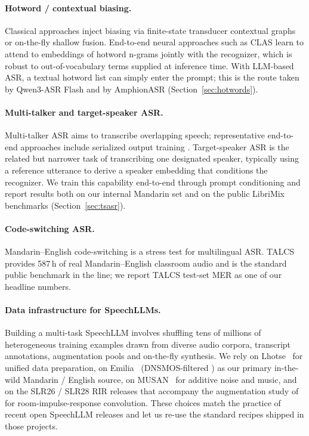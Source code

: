 \paragraph{Hotword / contextual biasing.}
Classical approaches inject biasing via finite-state transducer
contextual graphs or on-the-fly shallow fusion. End-to-end neural
approaches such as CLAS \cite{pundak2018deep} learn to attend to
embeddings of hotword n-grams jointly with the recognizer, which is
robust to out-of-vocabulary terms supplied at inference time. With
LLM-based ASR, a textual hotword list can simply enter the prompt; this
is the route taken by Qwen3-ASR Flash \cite{qwen2025qwen3asr} and by
AmphionASR (Section~\ref{sec:hotwords}).

\paragraph{Multi-talker and target-speaker ASR.}
Multi-talker ASR aims to transcribe overlapping speech; representative
end-to-end approaches include serialized output training
\cite{kanda2020serialized}. Target-speaker ASR is the related but
narrower task of transcribing one designated speaker, typically using a
reference utterance to derive a speaker embedding that conditions the
recognizer. We train this capability end-to-end through prompt
conditioning and report results both on our internal Mandarin set and
on the public LibriMix benchmarks \cite{cosentino2020librimix}
(Section~\ref{sec:tsasr}).

\paragraph{Code-switching ASR.}
Mandarin--English code-switching is a stress test for multilingual ASR.
TALCS \cite{li2022talcs} provides 587\,h of real Mandarin--English
classroom audio and is the standard public benchmark in the line; we
report TALCS test-set MER as one of our headline numbers.

\paragraph{Data infrastructure for SpeechLLMs.}
Building a multi-task SpeechLLM involves shuffling tens of millions of
heterogeneous training examples drawn from diverse audio corpora,
transcript annotations, augmentation pools and on-the-fly synthesis.
We rely on Lhotse~\cite{zelasko2021lhotse} for unified data
preparation, on Emilia~\cite{he2024emilia} (DNSMOS-filtered
\cite{reddy2021dnsmos}) as our primary in-the-wild Mandarin /
English source, on MUSAN~\cite{snyder2015musan} for additive noise
and music, and on the SLR26 / SLR28 RIR releases that accompany the
augmentation study of \cite{ko2017studyrir} for room-impulse-response
convolution. These choices match the practice of recent open
SpeechLLM releases and let us re-use the standard recipes shipped
in those projects.

